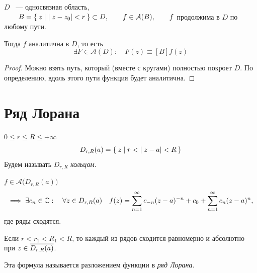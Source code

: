 \begin{theorem}
	$ D $ ~--- односвязная область, $ \qquad B = \Set{z \mid |z - z_0| < r} \subset D, \qquad f \in \mathcal A(B), \qquad f $ продолжима в $ D $ по любому пути.

	Тогда $ f $ аналитична в $ D $, то есть
	$$ \exists F \in \mathcal A(D) : \quad F(z) \equiv[B] f(z) $$
\end{theorem}

\begin{proof}
	Можно взять путь, который (вместе с кругами) полностью покроет $ D $.
	По определению, вдоль этого пути функция будет аналитична.
\end{proof}

\section{Ряд Лорана}

\begin{definition}
	$ 0 \le r \le R \le +\infty $
	$$ D_{r, R}(a) = \Set{z \mid r < |z - a| < R} $$
	Будем называть $ D_{r, R} $ \emph{кольцом}.
\end{definition}

\begin{theorem}
	$ f \in \mathcal A \big(D_{r, R}(a) \big) $
	$$ \implies \exists c_n \in \mathbb{C} : \quad \forall z \in D_{r, R}(a) \quad f(z) = \sum_{n = 1}^\infty c_{-n}(z - a)^{-n} + c_0 + \sum_{n = 1}^\infty c_n(z - a)^n, $$
	где ряды сходятся.

	Если $ r < r_1 < R_1 < R $, то каждый из рядов сходится равномерно и абсолютно при $ z \in \overline{D_{r, R}(a)} $.

	Эта формула называется разложением функции в \emph{ряд Лорана}.
\end{theorem}

